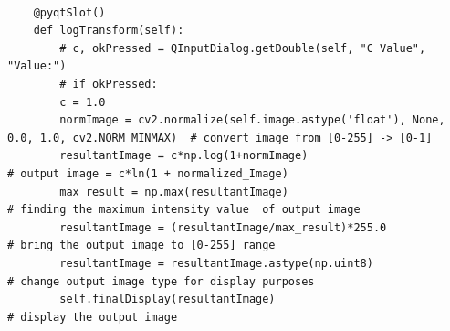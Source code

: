 \documentclass[letterpaper, 10 pt, conference]{ieeeconf}  %
\begin{document}
\begin{mdframed}
\begin{lstlisting}
    
    @pyqtSlot()
    def logTransform(self):
        # c, okPressed = QInputDialog.getDouble(self, "C Value", "Value:")
        # if okPressed:
        c = 1.0
        normImage = cv2.normalize(self.image.astype('float'), None, 0.0, 1.0, cv2.NORM_MINMAX)  # convert image from [0-255] -> [0-1]
        resultantImage = c*np.log(1+normImage)                                                  # output image = c*ln(1 + normalized_Image)
        max_result = np.max(resultantImage)                                                     # finding the maximum intensity value  of output image
        resultantImage = (resultantImage/max_result)*255.0                                      # bring the output image to [0-255] range
        resultantImage = resultantImage.astype(np.uint8)                                        # change output image type for display purposes
        self.finalDisplay(resultantImage)                                                       # display the output image


\end{lstlisting}
\end{mdframed}
\end{document}
